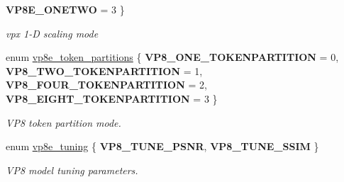 \begin{DoxyCompactItemize}
{\bfseries V\+P8\+E\+\_\+\+O\+N\+E\+T\+W\+O} = 3
 \}
\begin{DoxyCompactList}\small\item\em vpx 1-\/\+D scaling mode \end{DoxyCompactList}\item 
enum \hyperlink{group__vp8__encoder_ga5f7508ba3fb453b47f62313ed0b864d2}{vp8e\+\_\+token\+\_\+partitions} \{ {\bfseries V\+P8\+\_\+\+O\+N\+E\+\_\+\+T\+O\+K\+E\+N\+P\+A\+R\+T\+I\+T\+I\+O\+N} = 0, 
{\bfseries V\+P8\+\_\+\+T\+W\+O\+\_\+\+T\+O\+K\+E\+N\+P\+A\+R\+T\+I\+T\+I\+O\+N} = 1, 
{\bfseries V\+P8\+\_\+\+F\+O\+U\+R\+\_\+\+T\+O\+K\+E\+N\+P\+A\+R\+T\+I\+T\+I\+O\+N} = 2, 
{\bfseries V\+P8\+\_\+\+E\+I\+G\+H\+T\+\_\+\+T\+O\+K\+E\+N\+P\+A\+R\+T\+I\+T\+I\+O\+N} = 3
 \}
\begin{DoxyCompactList}\small\item\em V\+P8 token partition mode. \end{DoxyCompactList}\item 
enum \hyperlink{group__vp8__encoder_ga371dbc29054b3d46364af996ad42ab94}{vp8e\+\_\+tuning} \{ {\bfseries V\+P8\+\_\+\+T\+U\+N\+E\+\_\+\+P\+S\+N\+R}, 
{\bfseries V\+P8\+\_\+\+T\+U\+N\+E\+\_\+\+S\+S\+I\+M}
 \}
\begin{DoxyCompactList}\small\item\em V\+P8 model tuning parameters. \end{DoxyCompactList}\end{DoxyCompactItemize}
